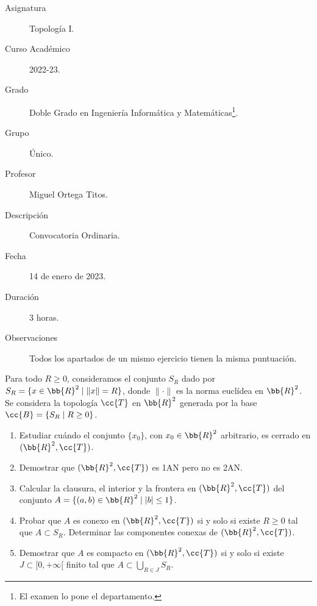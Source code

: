 \documentclass[12pt]{article}
\newcommand{\T}[0]{\cc{T}}
\begin{document}

    
    

    \begin{description}
        \item[Asignatura] Topología I.
        \item[Curso Académico] 2022-23.
        \item[Grado] Doble Grado en Ingeniería Informática y Matemáticas\footnote{El examen lo pone el departamento.}.
        \item[Grupo] Único.
        \item[Profesor] Miguel Ortega Titos.
        \item[Descripción] Convocatoria Ordinaria.
        \item[Fecha] 14 de enero de 2023.
        \item[Duración] 3 horas.
        \item[Observaciones] Todos los apartados de un mismo ejercicio tienen la misma puntuación.
    
    \end{description}
    \newpage
    
    \begin{ejercicio}[4.5 puntos]
        Para todo $R\geq 0$, consideramos el conjunto $S_R$ dado por $S_R= \{x\in \bb{R}^2\mid \|x\|= R\}$, donde $\|\cdot\|$ es la norma euclídea en $\bb{R}^2$.
        Se considera la topología $\T$ en $\bb{R}^2$ generada por la base $\cc{B}= \{S_R\mid R\geq 0\}$.
        \begin{enumerate}
            \item Estudiar cuándo el conjunto $\{x_0\}$, con $x_0\in \bb{R}^2$ arbitrario, es cerrado en $(\bb{R}^2,\T)$.
            \item Demostrar que $(\bb{R}^2,\T)$ es 1AN pero no es 2AN.
            \item Calcular la clausura, el interior y la frontera en $(\bb{R}^2,\T)$ del conjunto $A=\{(a,b)\in \bb{R}^2\mid |b|\leq 1\}$.
            \item Probar que $A$ es conexo en $(\bb{R}^2,\T)$ si y solo si existe $R\geq 0$ tal que $A\subset S_R$. Determinar
            las componentes conexas de $(\bb{R}^2,\T)$.
            \item Demostrar que $A$ es compacto en $(\bb{R}^2,\T)$ si y solo si existe $J\subset [0,+\infty[$ finito tal que
            $A\subset \bigcup\limits_{R\in J}S_R$.
        \end{enumerate}
    \end{ejercicio}
\end{document}
